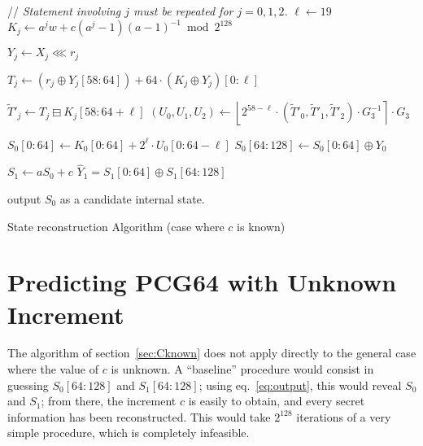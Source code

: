 \documentclass[preprint,svgnames]{iacrtrans}
\begin{document}
\begin{algorithm}
\begin{algorithmic}[1]
  \State // \emph{Statement involving $j$ must be repeated for $j=0, 1, 2$.}
  \State $\ell \gets 19$
   
    \State $K_j \gets a^j w + c (a^j - 1)(a-1)^{-1} \bmod 2^{128}$    
    
     
    
    \State $Y_j \gets X_j \lll r_j$ 
    
    \State $T_j \gets \left(r_j \oplus Y_j[58:64]\right) +  64 \cdot \left(K_j \oplus Y_j\right)[0:\ell]$  
    
    \State $\widetilde T'_j \gets T_j \boxminus K_j[58:64+\ell]$  
    \State $(U_0, U_1, U_2) \gets \left\lfloor 2^{58-\ell} \cdot (\widetilde T'_0, \widetilde T'_1, \widetilde T'_2) \cdot  G_3^{-1} \right\rceil \cdot G_3$ 

    \State $S_0[0:64] \gets  K_0[0:64] + 2^{\ell} \cdot U_0[0:64-\ell]$ 
    \State $S_0[64:128] \gets S_0[0:64] \oplus Y_0$ 
    
    \State $S_1 \gets a  S_0 + c$ 
    \State $\widehat{Y}_1 =  S_1[0:64] \oplus  S_1[64:128]$
    
     
    \State output $S_0$ as a candidate internal state.
    \EndIf
    \EndFor
    \EndFor
    \EndProcedure
  \end{algorithmic}
  \caption{State reconstruction Algorithm (case where $c$ is known)}
  \label{algo:known}
\end{algorithm}
  
\section{Predicting PCG64 with Unknown Increment}
\label{sec:Cunknown}

The algorithm of section~\ref{sec:Cknown} does not apply directly to the general
case where the value of $c$ is unknown. A ``baseline'' procedure would consist
in guessing $S_0[64:128]$ and $S_1[64:128]$; using eq.~\eqref{eq:output}, this
would reveal $S_0$ and $S_1$; from there, the increment $c$ is easily to obtain,
and every secret information has been reconstructed. This would take $2^{128}$
iterations of a very simple procedure, which is completely infeasible.
\end{document}
